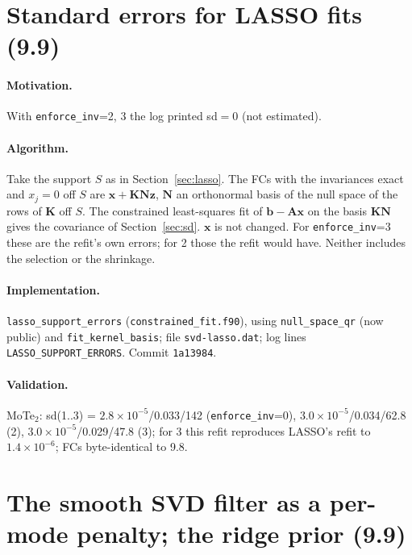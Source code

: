 \documentclass[11pt,a4paper]{article}
\newcommand{\bA}{\mathbf A}
\newcommand{\bK}{\mathbf K}
\newcommand{\bN}{\mathbf N}
\newcommand{\bx}{\mathbf x}
\newcommand{\bz}{\mathbf z}
\newcommand{\bb}{\mathbf b}
\newcommand{\code}[1]{\texttt{#1}}
\begin{document}
\section{Standard errors for LASSO fits (9.9)}\label{sec:lassoerr}
\paragraph{Motivation.} With \code{enforce\_inv}=2, 3 the log printed sd$=0$ (not estimated).

\paragraph{Algorithm.} Take the support $S$ as in Section~\ref{sec:lasso}. The FCs with the invariances
exact and $x_j=0$ off $S$ are $\bx+\bK\bN\bz$, $\bN$ an orthonormal basis of the null space of the rows of
$\bK$ off $S$. The constrained least-squares fit of $\bb-\bA\bx$ on the basis $\bK\bN$ gives the
covariance of Section~\ref{sec:sd}. $\bx$ is not changed. For \code{enforce\_inv}=3 these are the refit's own
errors; for 2 those the refit would have. Neither includes the selection or the shrinkage.

\paragraph{Implementation.} \code{lasso\_support\_errors} (\code{constrained\_fit.f90}), using
\code{null\_space\_qr} (now public) and \code{fit\_kernel\_basis}; file \code{svd-lasso.dat}; log lines
\code{LASSO\_SUPPORT\_ERRORS}. Commit \code{1a13984}.

\paragraph{Validation.} MoTe$_2$: sd(1..3) = $2.8\times10^{-5}$/0.033/142 (\code{enforce\_inv}=0),
$3.0\times10^{-5}$/0.034/62.8 (2), $3.0\times10^{-5}$/0.029/47.8 (3); for 3 this refit reproduces LASSO's refit to
$1.4\times10^{-6}$; FCs byte-identical to 9.8.

\section{The smooth SVD filter as a per-mode penalty; the ridge prior (9.9)}\label{sec:filter}
\end{document}
